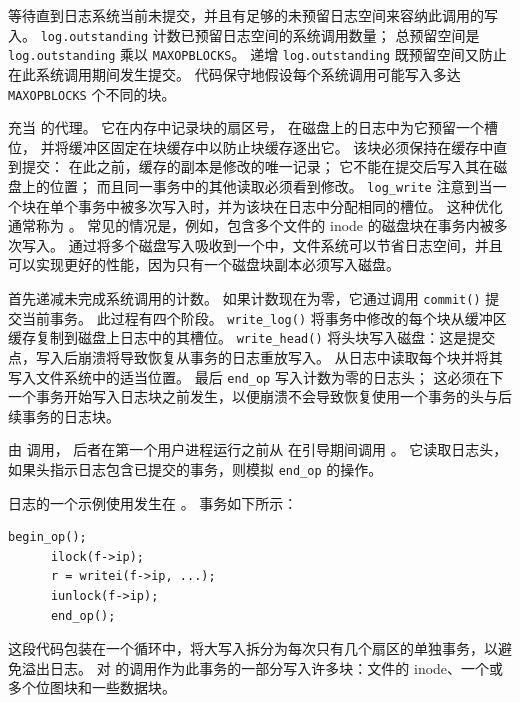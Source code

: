等待直到日志系统当前未提交，并且有足够的未预留日志空间来容纳此调用的写入。
\lstinline{log.outstanding}
计数已预留日志空间的系统调用数量；
总预留空间是
\lstinline{log.outstanding}
乘以
\lstinline{MAXOPBLOCKS}。
递增
\lstinline{log.outstanding}
既预留空间又防止在此系统调用期间发生提交。
代码保守地假设每个系统调用可能写入多达
\lstinline{MAXOPBLOCKS}
个不同的块。

充当
的代理。
它在内存中记录块的扇区号，
在磁盘上的日志中为它预留一个槽位，
并将缓冲区固定在块缓存中以防止块缓存逐出它。
该块必须保持在缓存中直到提交：
在此之前，缓存的副本是修改的唯一记录；
它不能在提交后写入其在磁盘上的位置；
而且同一事务中的其他读取必须看到修改。
\lstinline{log_write}
注意到当一个块在单个事务中被多次写入时，并为该块在日志中分配相同的槽位。
这种优化通常称为
。
常见的情况是，例如，包含多个文件的 inode 的磁盘块在事务内被多次写入。
通过将多个磁盘写入吸收到一个中，文件系统可以节省日志空间，并且可以实现更好的性能，因为只有一个磁盘块副本必须写入磁盘。

首先递减未完成系统调用的计数。
如果计数现在为零，它通过调用
\lstinline{commit()}
提交当前事务。
此过程有四个阶段。
\lstinline{write_log()}
将事务中修改的每个块从缓冲区缓存复制到磁盘上日志中的其槽位。
\lstinline{write_head()}
将头块写入磁盘：这是提交点，写入后崩溃将导致恢复从事务的日志重放写入。
从日志中读取每个块并将其写入文件系统中的适当位置。
最后
\lstinline{end_op}
写入计数为零的日志头；
这必须在下一个事务开始写入日志块之前发生，以便崩溃不会导致恢复使用一个事务的头与后续事务的日志块。

由
调用，
后者在第一个用户进程运行之前从  在引导期间调用
。
它读取日志头，如果头指示日志包含已提交的事务，则模拟
\lstinline{end_op}
的操作。

日志的一个示例使用发生在
。
事务如下所示：
\begin{lstlisting}[]
      begin_op();
      ilock(f->ip);
      r = writei(f->ip, ...);
      iunlock(f->ip);
      end_op();
\end{lstlisting}
这段代码包装在一个循环中，将大写入拆分为每次只有几个扇区的单独事务，以避免溢出日志。
对
的调用作为此事务的一部分写入许多块：文件的 inode、一个或多个位图块和一些数据块。

